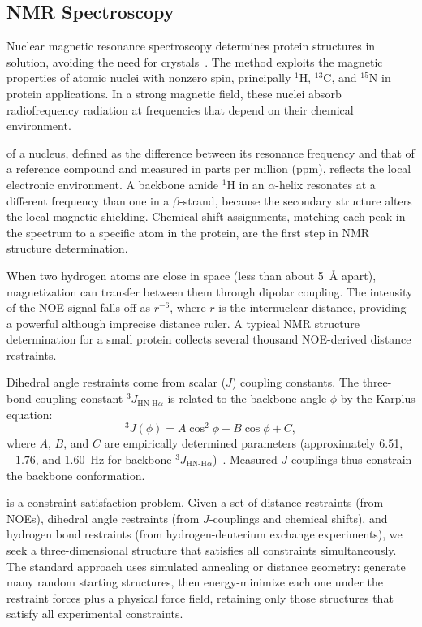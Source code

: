 \subsection{NMR Spectroscopy}
\label{sec:nmr}

Nuclear magnetic resonance spectroscopy determines protein structures in solution, avoiding the need for crystals~\cite{wuthrich1986}.  The method exploits the magnetic properties of atomic nuclei with nonzero spin, principally $^1$H, $^{13}$C, and $^{15}$N in protein applications.  In a strong magnetic field, these nuclei absorb radiofrequency radiation at frequencies that depend on their chemical environment.

 of a nucleus, defined as the difference between its resonance frequency and that of a reference compound and measured in parts per million (ppm), reflects the local electronic environment.  A backbone amide $^1$H in an $\alpha$-helix resonates at a different frequency than one in a $\beta$-strand, because the secondary structure alters the local magnetic shielding.  Chemical shift assignments, matching each peak in the spectrum to a specific atom in the protein, are the first step in NMR structure determination.

  When two hydrogen atoms are close in space (less than about 5~\AA{} apart), magnetization can transfer between them through dipolar coupling.  The intensity of the NOE signal falls off as $r^{-6}$, where $r$ is the internuclear distance, providing a powerful although imprecise distance ruler.  A typical NMR structure determination for a small protein collects several thousand NOE-derived distance restraints.

Dihedral angle restraints come from scalar ($J$) coupling constants.  The three-bond coupling constant $^3J_{\text{HN-H}\alpha}$ is related to the backbone angle $\phi$ by the Karplus equation:
\begin{equation}
  ^3J(\phi) = A\cos^2\phi + B\cos\phi + C,
  \label{eq:karplus}
\end{equation}
where $A$, $B$, and $C$ are empirically determined parameters (approximately 6.51, $-1.76$, and 1.60~Hz for backbone $^3J_{\text{HN-H}\alpha}$)~\cite{karplus1959}.  Measured $J$-couplings thus constrain the backbone conformation.

 is a constraint satisfaction problem.  Given a set of distance restraints (from NOEs), dihedral angle restraints (from $J$-couplings and chemical shifts), and hydrogen bond restraints (from hydrogen-deuterium exchange experiments), we seek a three-dimensional structure that satisfies all constraints simultaneously.  The standard approach uses simulated annealing or distance geometry: generate many random starting structures, then energy-minimize each one under the restraint forces plus a physical force field, retaining only those structures that satisfy all experimental constraints.

